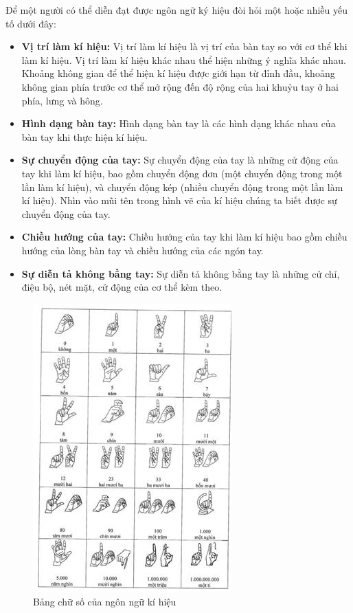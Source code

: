 \indent Để một người có thể diễn đạt được ngôn ngữ ký hiệu đòi hỏi một hoặc nhiều yếu tố dưới đây:
\begin{itemize}
    \item \textbf{Vị trí làm kí hiệu:} Vị trí làm kí hiệu là vị trí của bàn tay so với cơ thể khi làm kí hiệu. Vị trí làm kí hiệu khác nhau thể hiện những ý nghĩa khác nhau. Khoảng không gian để thể hiện kí hiệu được giới hạn từ đỉnh đầu, khoảng không gian phía trước cơ thể mở rộng đến độ rộng của hai khuỷu tay ở hai phía, lưng và hông.
    \item  \textbf{Hình dạng bàn tay:} Hình dạng bàn tay là các hình dạng khác nhau của bàn tay khi thực hiện kí hiệu.
    \item \textbf{Sự chuyển động của tay:} Sự chuyển động của tay là những cử động của tay khi làm kí hiệu, bao gồm chuyển động đơn (một chuyển động trong một lần làm kí hiệu), và chuyển động kép (nhiều chuyển động trong một lần làm kí hiệu). Nhìn vào mũi tên trong hình vẽ của kí hiệu chúng ta biết được sự chuyển động của tay.
    \item \textbf{Chiều hướng của tay:} Chiều hướng của tay khi làm kí hiệu bao gồm chiều hướng của lòng bàn tay và chiều hướng của các ngón tay.
    \item \textbf{Sự diễn tả không bằng tay:} Sự diễn tả không bằng tay là những cử chỉ, điệu bộ, nét mặt, cử động của cơ thể kèm theo.
\end{itemize}
\begin{figure}[H]
    \centering
    \includegraphics{Images/Theoretical basis/bangso.jpg}
    \caption{Bảng chữ số của ngôn ngữ kí hiệu}
    \label{fig:enter-label}
\end{figure}

